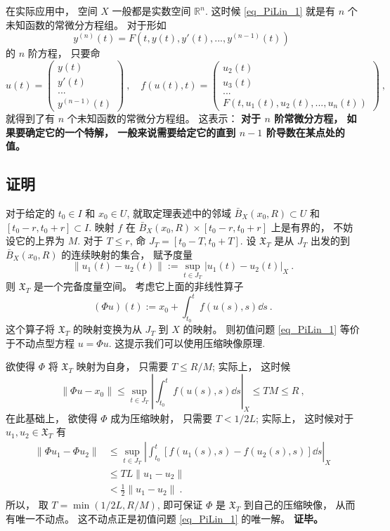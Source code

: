 在实际应用中， 空间 $X$ 一般都是实数空间 $\mathbb{R}^n$. 这时候 \autoref{eq_PiLin_1} 就是有 $n$ 个未知函数的常微分方程组。 对于形如
$$
y^{(n)}(t)=F(t,y(t),y'(t),...,y^{(n-1)}(t))~
$$
的 $n$ 阶方程， 只要命
$$
u(t)=\left(\begin{array}{c}
y(t)\\
y'(t)\\
...\\
y^{(n-1)}(t)
\end{array}
\right)~,\quad
f(u(t),t)=\left(\begin{array}{c}
u_2(t)\\
u_3(t)\\
...\\
F\left(t,u_1(t),u_2(t),...,u_n(t)\right)
\end{array}
\right)~,
$$
就得到了有 $n$ 个未知函数的常微分方程组。 这表示： \textbf{对于 $n$ 阶常微分方程， 如果要确定它的一个特解， 一般来说需要给定它的直到 $n-1$ 阶导数在某点处的值。}

\subsection{证明}
对于给定的 $t_0\in I$ 和 $x_0\in U$, 就取定理表述中的邻域 $\bar B_X(x_0,R)\subset U$ 和 $[t_0-r,t_0+r]\subset I$. 映射 $f$ 在 $\bar B_X(x_0,R)\times[t_0-r,t_0+r]$ 上是有界的， 不妨设它的上界为 $M$. 对于 $T\leq r$, 命 $J_T=[t_0-T,t_0+T]$. 设 $\mathfrak{X}_T$ 是从 $J_T$ 出发的到 $\bar B_X(x_0,R)$ 的连续映射的集合， 赋予度量
$$
\|u_1(t)-u_2(t)\|:=\sup_{t\in J_T}|u_1(t)-u_2(t)|_X~.
$$
则 $\mathfrak{X}_T$ 是一个完备度量空间。 考虑它上面的非线性算子
$$
(\Phi u)(t):=x_0+\int_{t_0}^tf(u(s),s)\dd s~.
$$ 
这个算子将 $\mathfrak{X}_T$ 的映射变换为从 $J_T$ 到 $X$ 的映射。 则初值问题 \autoref{eq_PiLin_1} 等价于不动点型方程 $u=\Phi u$. 这提示我们可以使用压缩映像原理.

欲使得 $\Phi$ 将 $\mathfrak{X}_T$ 映射为自身， 只需要 $T\leq R/M$; 实际上， 这时候
$$
\|\Phi u-x_0\|
\leq\sup_{t\in J_T}\left|\int_{t_0}^tf(u(s),s)\dd s\right|_X
\leq TM\leq R~,
$$
在此基础上， 欲使得 $\Phi$ 成为压缩映射， 只需要 $T<1/2L$; 实际上， 这时候对于 $u_1,u_2\in\mathfrak{X}_T$ 有
$$
\begin{aligned}
\|\Phi u_1-\Phi u_2\|
&\leq\sup_{t\in J_T}\left|\int_{t_0}^t[f(u_1(s),s)-f(u_2(s),s)]\dd s\right|_X \\
&\leq TL\|u_1-u_2\|\\
&<\frac{1}{2}\|u_1-u_2\|~.
\end{aligned}
$$
所以， 取 $T=\min\left(1/2L,R/M\right)$, 即可保证 $\Phi$ 是 $\mathfrak{X}_T$ 到自己的压缩映像， 从而有唯一不动点。 这不动点正是初值问题 \autoref{eq_PiLin_1} 的唯一解。 \textbf{证毕。}

